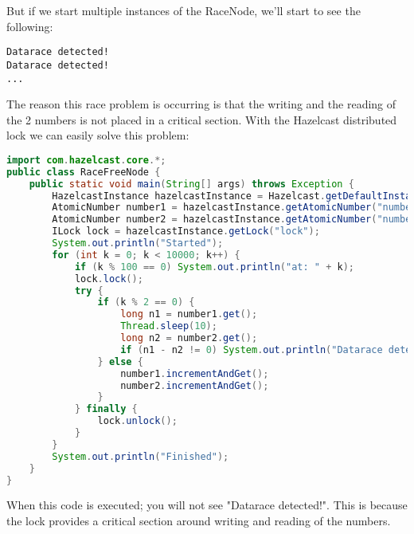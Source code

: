 But if we start multiple instances of the RaceNode, we'll start to see the following:
\begin{verbatim}
Datarace detected!
Datarace detected!
...
\end{verbatim}	
The reason this race problem is occurring is that the writing and the reading of the 2 numbers is not placed in a critical section. With the Hazelcast distributed lock we can easily solve this problem:
\begin{lstlisting}[language=java]
import com.hazelcast.core.*;
public class RaceFreeNode {
    public static void main(String[] args) throws Exception {
        HazelcastInstance hazelcastInstance = Hazelcast.getDefaultInstance();
        AtomicNumber number1 = hazelcastInstance.getAtomicNumber("number1");
        AtomicNumber number2 = hazelcastInstance.getAtomicNumber("number2");
        ILock lock = hazelcastInstance.getLock("lock");
        System.out.println("Started");
        for (int k = 0; k < 10000; k++) {
            if (k % 100 == 0) System.out.println("at: " + k);
            lock.lock();
            try {
                if (k % 2 == 0) {
                    long n1 = number1.get();
                    Thread.sleep(10);
                    long n2 = number2.get();
                    if (n1 - n2 != 0) System.out.println("Datarace detected!");
                } else {
                    number1.incrementAndGet();
                    number2.incrementAndGet();
                }
            } finally {
                lock.unlock();
            }
        }
        System.out.println("Finished");
    }
}
\end{lstlisting}
When this code is executed; you will not see "Datarace detected!". This is because the lock provides a critical section around writing and reading of the numbers. 

